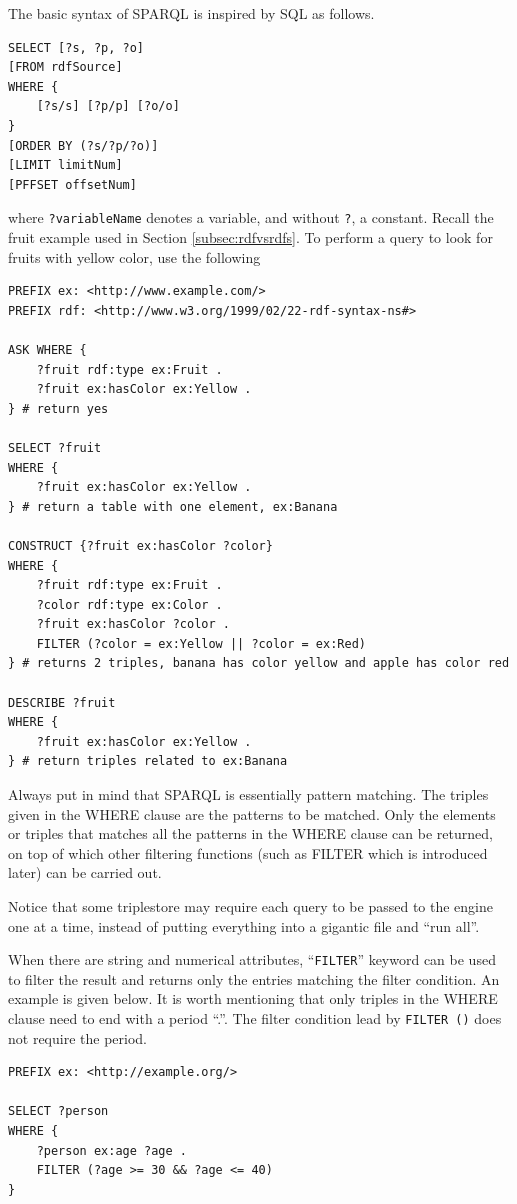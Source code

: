 The basic syntax of SPARQL is inspired by SQL as follows.
\begin{lstlisting}
SELECT [?s, ?p, ?o] 
[FROM rdfSource] 
WHERE {
	[?s/s] [?p/p] [?o/o]
}
[ORDER BY (?s/?p/?o)]
[LIMIT limitNum]
[PFFSET offsetNum]
\end{lstlisting}
where \verb|?variableName| denotes a variable, and without \verb|?|, a constant. Recall the fruit example used in Section \ref{subsec:rdfvsrdfs}. To perform a query to look for fruits with yellow color, use the following
\begin{lstlisting}
PREFIX ex: <http://www.example.com/>
PREFIX rdf: <http://www.w3.org/1999/02/22-rdf-syntax-ns#>

ASK WHERE {
	?fruit rdf:type ex:Fruit .
	?fruit ex:hasColor ex:Yellow .
} # return yes

SELECT ?fruit
WHERE {
	?fruit ex:hasColor ex:Yellow .
} # return a table with one element, ex:Banana

CONSTRUCT {?fruit ex:hasColor ?color}
WHERE {
	?fruit rdf:type ex:Fruit .
	?color rdf:type ex:Color .
	?fruit ex:hasColor ?color .
	FILTER (?color = ex:Yellow || ?color = ex:Red)
} # returns 2 triples, banana has color yellow and apple has color red

DESCRIBE ?fruit
WHERE {
	?fruit ex:hasColor ex:Yellow .
} # return triples related to ex:Banana
\end{lstlisting}

Always put in mind that SPARQL is essentially pattern matching. The triples given in the WHERE clause are the patterns to be matched. Only the elements or triples that matches all the patterns in the WHERE clause can be returned, on top of which other filtering functions (such as FILTER which is introduced later) can be carried out.

Notice that some triplestore may require each query to be passed to the engine one at a time, instead of putting everything into a gigantic file and ``run all''.

When there are string and numerical attributes, ``\verb|FILTER|'' keyword can be used to filter the result and returns only the entries matching the filter condition. An example is given below. It is worth mentioning that only triples in the WHERE clause need to end with a period ``.''. The filter condition lead by \verb|FILTER ()| does not require the period.
\begin{lstlisting}
PREFIX ex: <http://example.org/>

SELECT ?person 
WHERE {
	?person ex:age ?age .
	FILTER (?age >= 30 && ?age <= 40)
}
\end{lstlisting}

